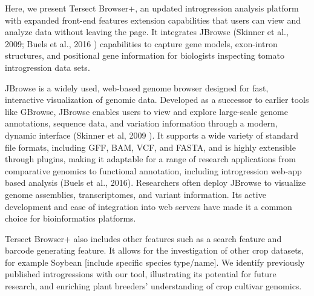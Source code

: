\documentclass[unnumsec,webpdf,contemporary,large]{oup-authoring-template}%
\theoremstyle{thmstyleone}%
\theoremstyle{thmstyletwo}%
\theoremstyle{thmstylethree}%
\begin{document}
Here, we present Tersect Browser+, an updated introgression analysis platform with expanded front-end features extension capabilities that users can view and analyze data without leaving the page.  It integrates JBrowse (Skinner et al., 2009\cite{skinner_jbrowse_2009}; Buels et al., 2016 \cite{buels_jbrowse_2016}) capabilities to capture gene models, exon-intron structures, and positional gene information for biologists inspecting tomato introgression data sets. 

JBrowse is a widely used, web-based genome browser designed for fast, interactive visualization of genomic data. Developed as a successor to earlier tools like GBrowse, JBrowse enables users to view and explore large-scale genome annotations, sequence data, and variation information through a modern, dynamic interface (Skinner et al, 2009 \cite{skinner_jbrowse_2009}). It supports a wide variety of standard file formats, including GFF, BAM, VCF, and FASTA, and is highly extensible through plugins, making it adaptable for a range of research applications from comparative genomics to functional annotation, including introgression web-app based analysis (Buels et al., 2016\cite{buels_jbrowse_2016}). Researchers often deploy JBrowse to visualize genome assemblies, transcriptomes, and variant information. Its active development and ease of integration into web servers have made it a common choice for bioinformatics platforms. 

Tersect Browser+ also includes other features such as a search feature and barcode generating feature. It allows for the investigation of other crop datasets, for example Soybean [include specific species type/name]. We identify previously published introgressions with our tool, illustrating its potential for future research, and enriching plant breeders' understanding of crop cultivar genomics.



\end{document}
